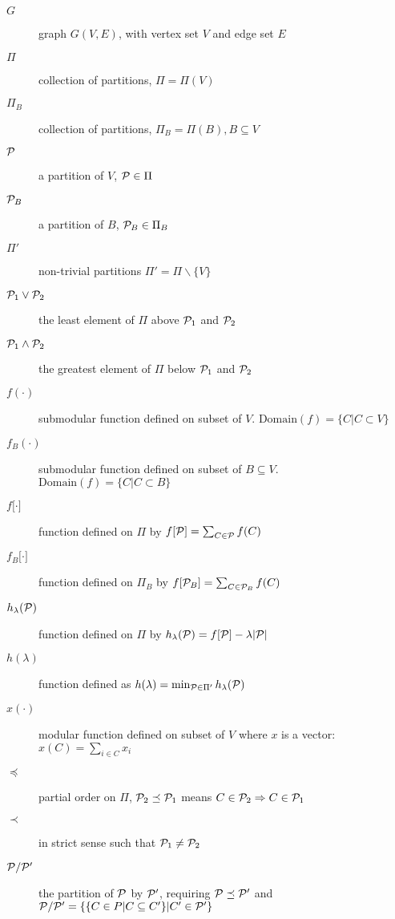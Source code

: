 \begin{description}
\item[$G$] graph $G(V,E)$, with vertex set $V$ and edge set $E$
\item[$\Pi$] collection of partitions, $\Pi = \Pi(V)$
\item[$\Pi_B$] collection of partitions, $\Pi_B = \Pi(B), B\subseteq V$
\item[$\P$] a partition of $V$, $\P \in \Pi$
\item[$\P_B$] a partition of $B$, $\P_B \in \Pi_B$
\item[$\Pi'$] non-trivial partitions $\Pi' = \Pi \backslash \{V\}$
\item[$\P_1 \vee \P_2$] the least element of $\Pi$ above $\P_1$ and $\P_2$
\item[$\P_1 \wedge \P_2$] the greatest element of $\Pi$ below $\P_1$ and $\P_2$
\item[$f(\cdot)$] submodular function defined on subset of $V$. $\mathrm{Domain}(f)=\{C| C\subset V\}$
\item[$f_B(\cdot)$] submodular function defined on subset of $B\subseteq V$. $\mathrm{Domain}(f)=\{C| C\subset B\}$
\item[$f{[}\cdot{]}$] function defined on $\Pi$ by $f[\P] = \sum_{C\in \P} f(C)$
\item[$f_B{[}\cdot{]}$] function defined on $\Pi_B$ by $f[\P_B] = \sum_{C\in \P_B} f(C)$
\item[$h_{\lambda}(\P)$] function defined on $\Pi$ by $h_{\lambda}(\P)=f[\P]-\lambda\abs{\P}$
\item[$h(\lambda)$] function defined as $ h(\lambda) = \min_{\P \in \Pi'} h_{\lambda}(\P)$
\item[$x(\cdot)$] modular function defined on subset of $V$ where $x$ is a vector: $x(C)=\sum_{i \in C} x_i$
\item[$\preceq$] partial order on $\Pi$, $\P_2 \preceq \P_1$ means $C\in \P_2 \Rightarrow C \in \P_1$
\item[$\prec$] in strict sense such that $\P_1 \neq \P_2 $
\item[$\P/\P'$] the partition of $\P$ by $\P'$, requiring $\P\preceq \P'$ and $\P/\P'=\{\{ C \in P | C \subseteq C' \} | C' \in \P'\}$
\end{description}

